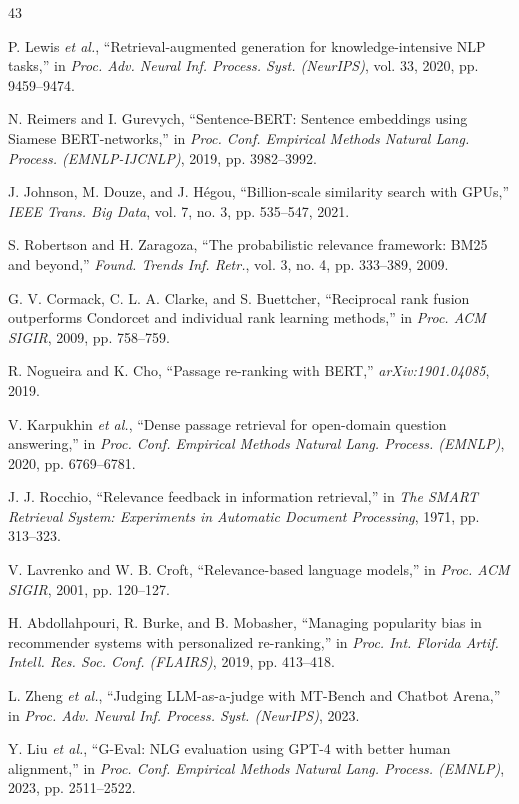 \documentclass{ieeeaccess}
\begin{document}
\begin{thebibliography}{43}

 P. Lewis \emph{et al.}, ``Retrieval-augmented generation for knowledge-intensive NLP tasks,'' in \emph{Proc. Adv. Neural Inf. Process. Syst. (NeurIPS)}, vol. 33, 2020, pp. 9459--9474.

 N. Reimers and I. Gurevych, ``Sentence-BERT: Sentence embeddings using Siamese BERT-networks,'' in \emph{Proc. Conf. Empirical Methods Natural Lang. Process. (EMNLP-IJCNLP)}, 2019, pp. 3982--3992.

 J. Johnson, M. Douze, and J. H\'egou, ``Billion-scale similarity search with GPUs,'' \emph{IEEE Trans. Big Data}, vol. 7, no. 3, pp. 535--547, 2021.

 S. Robertson and H. Zaragoza, ``The probabilistic relevance framework: BM25 and beyond,'' \emph{Found. Trends Inf. Retr.}, vol. 3, no. 4, pp. 333--389, 2009.

 G. V. Cormack, C. L. A. Clarke, and S. Buettcher, ``Reciprocal rank fusion outperforms Condorcet and individual rank learning methods,'' in \emph{Proc. ACM SIGIR}, 2009, pp. 758--759.

 R. Nogueira and K. Cho, ``Passage re-ranking with BERT,'' \emph{arXiv:1901.04085}, 2019.

 V. Karpukhin \emph{et al.}, ``Dense passage retrieval for open-domain question answering,'' in \emph{Proc. Conf. Empirical Methods Natural Lang. Process. (EMNLP)}, 2020, pp. 6769--6781.

 J. J. Rocchio, ``Relevance feedback in information retrieval,'' in \emph{The SMART Retrieval System: Experiments in Automatic Document Processing}, 1971, pp. 313--323.

 V. Lavrenko and W. B. Croft, ``Relevance-based language models,'' in \emph{Proc. ACM SIGIR}, 2001, pp. 120--127.

 H. Abdollahpouri, R. Burke, and B. Mobasher, ``Managing popularity bias in recommender systems with personalized re-ranking,'' in \emph{Proc. Int. Florida Artif. Intell. Res. Soc. Conf. (FLAIRS)}, 2019, pp. 413--418.

 L. Zheng \emph{et al.}, ``Judging LLM-as-a-judge with MT-Bench and Chatbot Arena,'' in \emph{Proc. Adv. Neural Inf. Process. Syst. (NeurIPS)}, 2023.

 Y. Liu \emph{et al.}, ``G-Eval: NLG evaluation using GPT-4 with better human alignment,'' in \emph{Proc. Conf. Empirical Methods Natural Lang. Process. (EMNLP)}, 2023, pp. 2511--2522.


\end{thebibliography}
\end{document}
